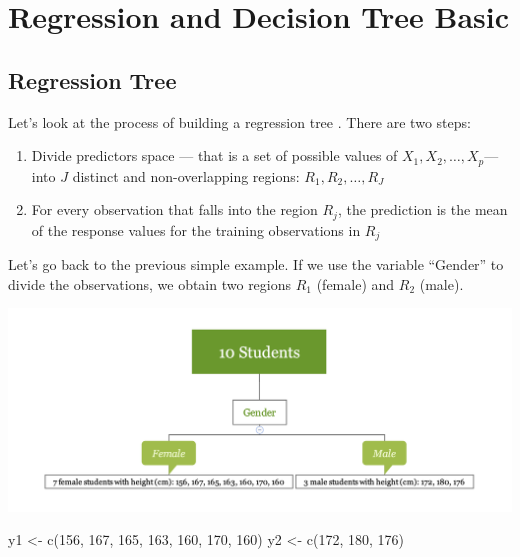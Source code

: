 \documentclass[
  12pt,
]{krantz}
\makeatletter
\newenvironment{Shaded}{\begin{snugshade}}{\end{snugshade}}
\newcommand{\DecValTok}[1]{\textcolor[rgb]{0.06,0.06,0.06}{#1}}
\newcommand{\FunctionTok}[1]{\textcolor[rgb]{0,0,0}{#1}}
\newcommand{\NormalTok}[1]{#1}
\newcommand{\OtherTok}[1]{\textcolor[rgb]{0.37,0.37,0.37}{#1}}
\providecommand{\tightlist}{%
  \setlength{\itemsep}{0pt}\setlength{\parskip}{0pt}}
\newenvironment{kframe}{%
\medskip{}
\setlength{\fboxsep}{.8em}
 \def\at@end@of@kframe{}%
 \ifinner\ifhmode%
  \def\at@end@of@kframe{\end{minipage}}%
  \begin{minipage}{\columnwidth}%
 \fi\fi%
 \def\FrameCommand##1{\hskip\@totalleftmargin \hskip-\fboxsep
 \colorbox{shadecolor}{##1}\hskip-\fboxsep
     \hskip-\linewidth \hskip-\@totalleftmargin \hskip\columnwidth}%
 \MakeFramed {\advance\hsize-\width
   \@totalleftmargin\z@ \linewidth\hsize
   \@setminipage}}%
 {\par\unskip\endMakeFramed%
 \at@end@of@kframe}
\renewenvironment{Shaded}{\begin{kframe}}{\end{kframe}}
\makeatother
\begin{document}
\hypertarget{regression-and-decision-tree-basic}{%
\section{Regression and Decision Tree Basic}\label{regression-and-decision-tree-basic}}

\hypertarget{regression-tree}{%
\subsection{Regression Tree}\label{regression-tree}}

Let's look at the process of building a regression tree \citep{ISLR15}. There are two steps:

\begin{enumerate}
\def\labelenumi{\arabic{enumi}.}
\tightlist
\item
  Divide predictors space --- that is a set of possible values of \(X_1,X_2,\dots,X_p\)--- into \(J\) distinct and non-overlapping regions: \(R_1,R_2,\dots,R_J\)
\item
  For every observation that falls into the region \(R_j\), the prediction is the mean of the response values for the training observations in \(R_j\)
\end{enumerate}

Let's go back to the previous simple example. If we use the variable ``Gender'' to divide the observations, we obtain two regions \(R_1\) (female) and \(R_2\) (male).

\includegraphics{images/varEN.png}

\begin{Shaded}
\begin{Highlighting}[]
\NormalTok{y1 }\OtherTok{\textless{}{-}} \FunctionTok{c}\NormalTok{(}\DecValTok{156}\NormalTok{, }\DecValTok{167}\NormalTok{, }\DecValTok{165}\NormalTok{, }\DecValTok{163}\NormalTok{, }\DecValTok{160}\NormalTok{, }\DecValTok{170}\NormalTok{, }\DecValTok{160}\NormalTok{)}
\NormalTok{y2 }\OtherTok{\textless{}{-}} \FunctionTok{c}\NormalTok{(}\DecValTok{172}\NormalTok{, }\DecValTok{180}\NormalTok{, }\DecValTok{176}\NormalTok{)}
\end{Highlighting}
\end{Shaded}
\end{document}

